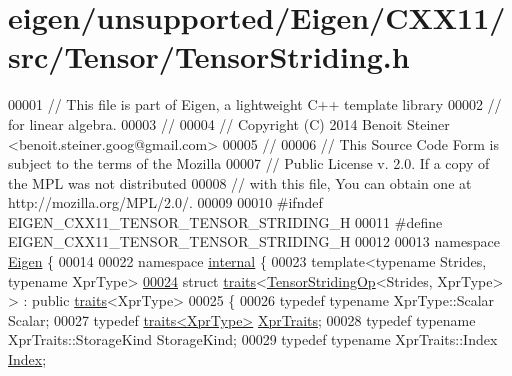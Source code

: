 \hypertarget{eigen_2unsupported_2_eigen_2_c_x_x11_2src_2_tensor_2_tensor_striding_8h_source}{}\section{eigen/unsupported/\+Eigen/\+C\+X\+X11/src/\+Tensor/\+Tensor\+Striding.h}
\label{eigen_2unsupported_2_eigen_2_c_x_x11_2src_2_tensor_2_tensor_striding_8h_source}

\begin{DoxyCode}
00001 \textcolor{comment}{// This file is part of Eigen, a lightweight C++ template library}
00002 \textcolor{comment}{// for linear algebra.}
00003 \textcolor{comment}{//}
00004 \textcolor{comment}{// Copyright (C) 2014 Benoit Steiner <benoit.steiner.goog@gmail.com>}
00005 \textcolor{comment}{//}
00006 \textcolor{comment}{// This Source Code Form is subject to the terms of the Mozilla}
00007 \textcolor{comment}{// Public License v. 2.0. If a copy of the MPL was not distributed}
00008 \textcolor{comment}{// with this file, You can obtain one at http://mozilla.org/MPL/2.0/.}
00009 
00010 \textcolor{preprocessor}{#ifndef EIGEN\_CXX11\_TENSOR\_TENSOR\_STRIDING\_H}
00011 \textcolor{preprocessor}{#define EIGEN\_CXX11\_TENSOR\_TENSOR\_STRIDING\_H}
00012 
00013 \textcolor{keyword}{namespace }\hyperlink{namespace_eigen}{Eigen} \{
00014 
00022 \textcolor{keyword}{namespace }\hyperlink{namespaceinternal}{internal} \{
00023 \textcolor{keyword}{template}<\textcolor{keyword}{typename} Str\textcolor{keywordtype}{id}es, \textcolor{keyword}{typename} XprType>
\hyperlink{struct_eigen_1_1internal_1_1traits_3_01_tensor_striding_op_3_01_strides_00_01_xpr_type_01_4_01_4}{00024} \textcolor{keyword}{struct }\hyperlink{struct_eigen_1_1internal_1_1traits}{traits}<\hyperlink{class_eigen_1_1_tensor_striding_op}{TensorStridingOp}<Strides, XprType> > : \textcolor{keyword}{public} 
      \hyperlink{struct_eigen_1_1internal_1_1traits}{traits}<XprType>
00025 \{
00026   \textcolor{keyword}{typedef} \textcolor{keyword}{typename} XprType::Scalar Scalar;
00027   \textcolor{keyword}{typedef} \hyperlink{struct_eigen_1_1internal_1_1traits}{traits<XprType>} \hyperlink{struct_eigen_1_1internal_1_1traits}{XprTraits};
00028   \textcolor{keyword}{typedef} \textcolor{keyword}{typename} XprTraits::StorageKind StorageKind;
00029   \textcolor{keyword}{typedef} \textcolor{keyword}{typename} XprTraits::Index \hyperlink{namespace_eigen_a62e77e0933482dafde8fe197d9a2cfde}{Index};

\end{DoxyCode}
